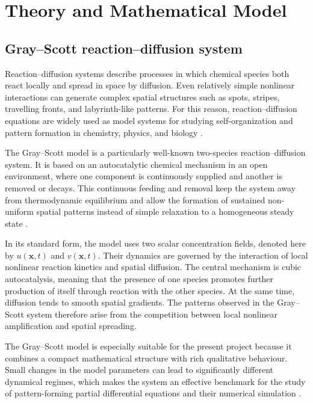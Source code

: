 \chapter{Theory and Mathematical Model}

\section{Gray--Scott reaction--diffusion system}

Reaction--diffusion systems describe processes in which chemical species both react locally and spread in space by diffusion. Even relatively simple nonlinear interactions can generate complex spatial structures such as spots, stripes, travelling fronts, and labyrinth-like patterns. For this reason, reaction--diffusion equations are widely used as model systems for studying self-organization and pattern formation in chemistry, physics, and biology \citep{gandy2022,pearson1993}.

The Gray--Scott model is a particularly well-known two-species reaction--diffusion system. It is based on an autocatalytic chemical mechanism in an open environment, where one component is continuously supplied and another is removed or decays. This continuous feeding and removal keep the system away from thermodynamic equilibrium and allow the formation of sustained non-uniform spatial patterns instead of simple relaxation to a homogeneous steady state \citep{gray1984,gandy2022,pearson1993}.

In its standard form, the model uses two scalar concentration fields, denoted here by $u(\mathbf{x},t)$ and $v(\mathbf{x},t)$. Their dynamics are governed by the interaction of local nonlinear reaction kinetics and spatial diffusion. The central mechanism is cubic autocatalysis, meaning that the presence of one species promotes further production of itself through reaction with the other species. At the same time, diffusion tends to smooth spatial gradients. The patterns observed in the Gray--Scott system therefore arise from the competition between local nonlinear amplification and spatial spreading.

The Gray--Scott model is especially suitable for the present project because it combines a compact mathematical structure with rich qualitative behaviour. Small changes in the model parameters can lead to significantly different dynamical regimes, which makes the system an effective benchmark for the study of pattern-forming partial differential equations and their numerical simulation \citep{gandy2022,pearson1993}.

